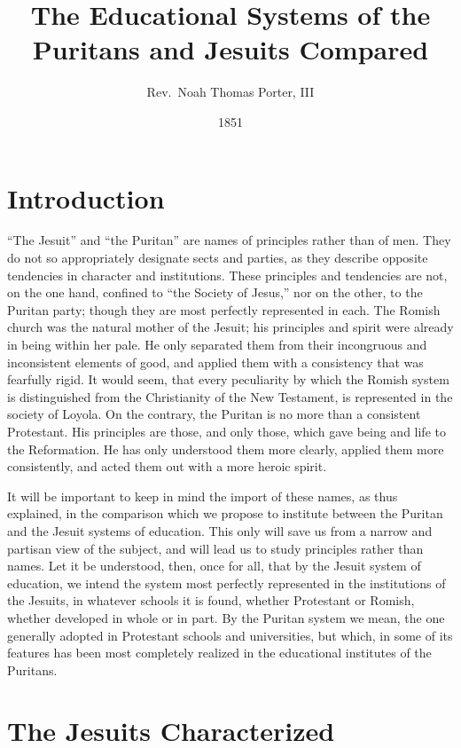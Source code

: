 \documentclass[]{book}
\title{The Educational Systems of the Puritans and Jesuits Compared}
\author{Rev.~Noah Thomas Porter, III}
\date{1851}
\begin{document}
\maketitle

{
\setcounter{tocdepth}{1}
\tableofcontents
}
\hypertarget{introduction}{%
\chapter*{Introduction}\label{introduction}}

``The Jesuit'' and ``the Puritan'' are names of principles rather than of men. They do not so appropriately designate sects and parties, as they describe opposite tendencies in character and institutions. These principles and tendencies are not, on the one hand, confined to ``the Society of Jesus,'' nor on the other, to the Puritan party; though they are most perfectly represented in each. The Romish church was the natural mother of the Jesuit; his principles and spirit were already in being within her pale. He only separated them from their incongruous and inconsistent elements of good, and applied them with a consistency that was fearfully rigid. It would seem, that every peculiarity by which the Romish system is distinguished from the Christianity of the New Testament, is represented in the society of Loyola. On the contrary, the Puritan is no more than a consistent Protestant. His principles are those, and only those, which gave being and life to the Reformation. He has only understood them more clearly, applied them more consistently, and acted them out with a more heroic spirit.

It will be important to keep in mind the import of these names, as thus explained, in the comparison which we propose to institute between the Puritan and the Jesuit systems of education. This only will save us from a narrow and partisan view of the subject, and will lead us to study principles rather than names. Let it be understood, then, once for all, that by the Jesuit system of education, we intend the system most perfectly represented in the institutions of the Jesuits, in whatever schools it is found, whether Protestant or Romish, whether developed in whole or in part. By the Puritan system we mean, the one generally adopted in Protestant schools and universities, but which, in some of its features has been most completely realized in the educational institutes of the Puritans.

\hypertarget{the-jesuits-characterized}{%
\chapter{The Jesuits Characterized}\label{the-jesuits-characterized}}
\end{document}
